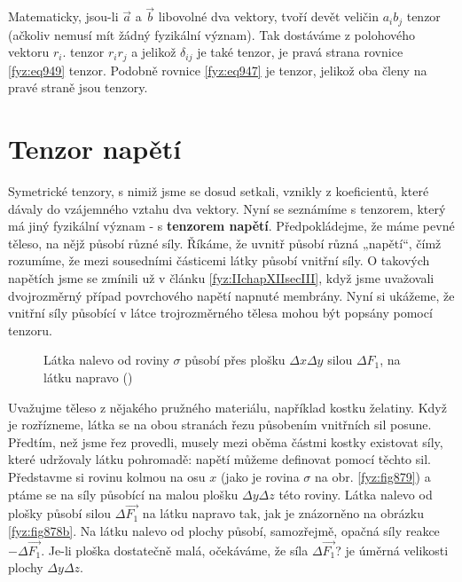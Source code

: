     Matematicky, jsou-li \(\vec{a}\) a \(\vec{b}\) libovolné dva vektory, tvoří devět veličin
    \(a_ib_j\) tenzor (ačkoliv nemusí mít žádný fyzikální význam). Tak dostáváme z polohového
    vektoru \(r_i\). tenzor \(r_ir_j\) a jelikož \(\delta_{ij}\) je také tenzor, je pravá strana
    rovnice \eqref{fyz:eq949} tenzor. Podobně rovnice \eqref{fyz:eq947} je tenzor, jelikož oba členy
    na pravé straně jsou tenzory.

  \section{Tenzor napětí}\label{fyz:IIchapXXXIsecVI} 

    Symetrické tenzory, s nimiž jsme se dosud setkali, vznikly z koeficientů, které dávaly do
    vzájemného vztahu dva vektory. Nyní se seznámíme s tenzorem, který má jiný fyzikální význam - s
    \textbf{tenzorem napětí}. Předpokládejme, že máme pevné těleso, na nějž působí různé síly.
    Říkáme, že uvnitř působí různá „napětí“, čímž rozumíme, že mezi sousedními částicemi látky
    působí vnitřní síly. O takových napětích jsme se zmínili už v článku \ref{fyz:IIchapXIIsecIII},
    když jsme uvažovali dvojrozměrný případ povrchového napětí napnuté membrány. Nyní si ukážeme, že
    vnitřní síly působící v látce trojrozměrného tělesa mohou být popsány pomocí tenzoru.

    \begin{figure}[ht!] %
      \centering
      \caption{Látka nalevo od roviny \(\sigma\) působí přes plošku \(\Delta x\Delta y\) silou
              \(\Delta F_1\), na látku napravo (\cite[s.~583]{Feynman02})}
      \label{fyz:fig878}
    \end{figure}

    Uvažujme těleso z nějakého pružného materiálu, například kostku želatiny. Když je rozřízneme,
    látka se na obou stranách řezu působením vnitřních sil posune. Předtím, než jsme řez provedli,
    musely mezi oběma částmi kostky existovat síly, které udržovaly látku pohromadě: napětí můžeme
    definovat pomocí těchto sil. Představme si rovinu kolmou na osu \(x\) (jako je rovina \(\sigma\)
    na obr. \ref{fyz:fig879}) a ptáme se na síly působící na malou plošku \(\Delta y\Delta z\) této
    roviny. Látka nalevo od plošky působí silou \(Δ\vec{F_1}\) na látku napravo tak, jak je
    znázorněno na obrázku \ref{fyz:fig878b}. Na látku nalevo od plochy působí, samozřejmě, opačná
    síly reakce \(-Δ\vec{F_1}\). Je-li ploška dostatečně malá, očekáváme, že síla \(Δ\vec{F_1}\)? je
    úměrná velikosti plochy \(\Delta y\Delta z\).

